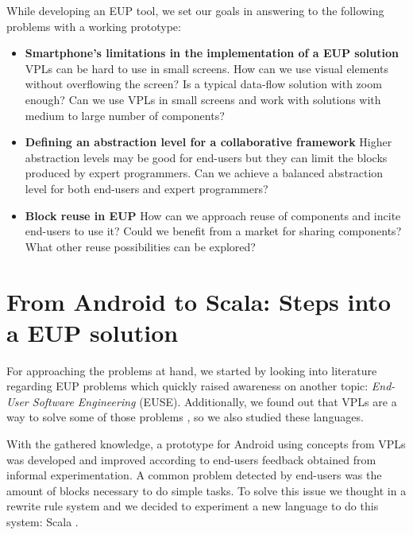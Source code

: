 \documentclass[9pt,a4paper]{extarticle}
\begin{document}
\begin{multicols}{2}
While developing an EUP tool, we set our goals in answering to the following problems with a working prototype:

\begin{itemize}
	\item{\textbf{Smartphone's limitations in the implementation of a EUP solution}
    VPLs can be hard to use in small screens. How can we use visual elements without overflowing the screen? Is a typical data-flow solution with zoom enough? Can we use VPLs in small screens and work with solutions with medium to large number of components?}
	
	\item{\textbf{Defining an abstraction level for a collaborative framework}
	Higher abstraction levels may be good for end-users but they can limit the blocks produced by expert programmers. Can we achieve a balanced abstraction level for both end-users and expert programmers?}
  
	\item{\textbf{Block reuse in EUP} 
    How can we approach reuse of components and incite end-users to use it?
    Could we benefit from a market for sharing components? What other reuse possibilities can be explored?}
	
\end{itemize}

\section{From Android to Scala: Steps into a EUP solution}\label{sec:work}

For approaching the problems at hand, we started by looking into literature regarding EUP problems \cite{Barriers2004} which quickly raised awareness on another topic: \emph{End-User Software Engineering} (EUSE).
Additionally, we found out that VPLs are a way to solve some of those problems \cite{Navarro2001}, so we also studied these languages.

With the gathered knowledge, a prototype for Android using concepts from VPLs was developed and improved according to end-users feedback obtained from informal experimentation. 
A common problem detected by end-users was the amount of blocks necessary to do simple tasks. To solve this issue we thought in a rewrite rule system and we decided to experiment a new language to do this system: Scala \cite{ProgrammingScala}.


\end{multicols}
\end{document}
